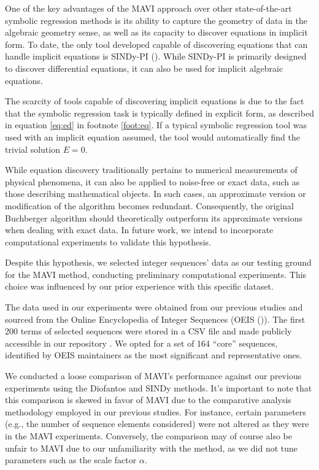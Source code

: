 \documentclass[runningheads]{llncs}
\begin{document}
One of the key advantages of the MAVI approach over other state-of-the-art symbolic regression methods is its ability to capture the geometry of data in the algebraic geometry sense, as well as its capacity to discover equations in implicit form. To date, the only
tool developed capable of discovering equations that can handle implicit equations is SINDy-PI (\cite{sindyPI}). 
While SINDy-PI is primarily designed to discover differential equations, it can also be used for implicit algebraic equations.

The scarcity of tools capable of discovering implicit equations is due to the fact that the symbolic regression task is typically defined in explicit form, as described in equation \ref{eq:ed} in footnote \ref{foot:eq}. If a typical symbolic regression tool was used with an implicit equation assumed, the tool would automatically find the trivial solution $E = 0$.




While equation discovery traditionally pertains to numerical measurements of physical phenomena, it can also be applied to noise-free or exact data, such as those describing mathematical objects. In such cases, an approximate version or modification of the algorithm becomes redundant. Consequently, the original Buchberger algorithm should theoretically outperform its approximate versions when dealing with exact data.
In future work, we intend to incorporate computational experiments to validate this hypothesis.

Despite this hypothesis, we selected integer sequences’ data as our testing ground 
for the MAVI method, conducting preliminary computational experiments. This choice was influenced by our prior experience with this specific dataset.

The data used in our experiments were obtained from our previous studies and 
sourced from the Online Encyclopedia of Integer Sequences (OEIS (\cite{oeis})). 
The first 200 terms of selected sequences were stored in a CSV file and made 
publicly accessible in our repository \cite{git diofantos}. 
We opted for a set of 164 “core” sequences, identified by OEIS maintainers as the 
most significant and representative ones.

We conducted a loose comparison of MAVI’s performance against our previous experiments using the Diofantos and SINDy methods. It’s important to note that this comparison is skewed in favor of MAVI due to the comparative analysis methodology employed in our previous studies. For instance, certain parameters (e.g., the number of sequence elements considered) were not altered as they were in the MAVI experiments. 
Conversely, the comparison may of course also be unfair to MAVI due to our unfamiliarity
with the method, as we did not tune parameters such as the scale factor $\alpha$.
\end{document}
